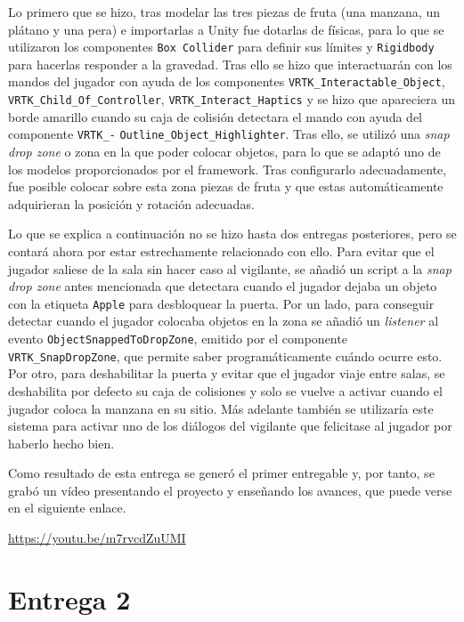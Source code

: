 Lo primero que se hizo, tras modelar las tres piezas de fruta (una manzana, un plátano y una pera) e importarlas a Unity fue dotarlas de físicas, para lo que se utilizaron los componentes \texttt{Box Collider} para definir sus límites y \texttt{Rigidbody} para hacerlas responder a la gravedad. Tras ello se hizo que interactuarán con los mandos del jugador con ayuda de los componentes \texttt{VRTK\_Interactable\_Object}, \texttt{VRTK\_Child\_Of\_Controller}, \texttt{VRTK\_Interact\_Haptics} y se hizo que apareciera un borde amarillo cuando su caja de colisión detectara el mando con ayuda del componente \texttt{VRTK\_-} \texttt{Outline\_Object\_Highlighter}. Tras ello, se utilizó una \textit{snap drop zone} o zona en la que poder colocar objetos, para lo que se adaptó uno de los modelos proporcionados por el framework. Tras configurarlo adecuadamente, fue posible colocar sobre esta zona piezas de fruta y que estas automáticamente adquirieran la posición y rotación adecuadas.

Lo que se explica a continuación no se hizo hasta dos entregas posteriores, pero se contará ahora por estar estrechamente relacionado con ello. Para evitar que el jugador saliese de la sala sin hacer caso al vigilante, se añadió un script a la \textit{snap drop zone} antes mencionada que detectara cuando el jugador dejaba un objeto con la etiqueta \texttt{Apple} para desbloquear la puerta. Por un lado, para conseguir detectar cuando el jugador colocaba objetos en la zona se añadió un \textit{listener} al evento \texttt{ObjectSnappedToDropZone}, emitido por el componente \texttt{VRTK\_SnapDropZone}, que permite saber programáticamente cuándo ocurre esto. Por otro, para deshabilitar la puerta y evitar que el jugador viaje entre salas, se deshabilita por defecto su caja de colisiones y solo se vuelve a activar cuando el jugador coloca la manzana en su sitio. Más adelante también se utilizaría este sistema para activar uno de los diálogos del vigilante que felicitase al jugador por haberlo hecho bien.

Como resultado de esta entrega se generó el primer entregable y, por tanto, se grabó un vídeo presentando el proyecto y enseñando los avances, que puede verse en el siguiente enlace.

\begin{center}
    \url{https://youtu.be/m7rvcdZuUMI}
\end{center}



\section{Entrega 2}

